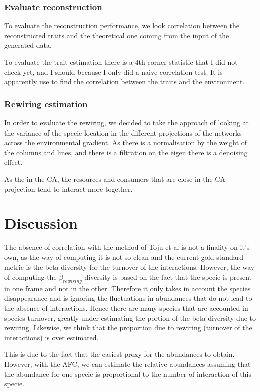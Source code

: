 \documentclass{article}
\begin{document}
\subsubsection{Evaluate reconstruction}

To evaluate the reconstruction performance, we look correlation between the reconstructed traits and the theoretical one coming from the input of the generated data.

To evaluate the trait estimation there is a 4th corner statistic that I did not check yet, and I should because I only did a naive correlation test. It is apparently use to find the correlation between the traits and the environment.

\subsubsection{Rewiring estimation}

In order to evaluate the rewiring, we decided to take the approach of looking at the variance of the specie location in the different projections of the networks across the environmental gradient. 
As there is a normalisation by the weight of the columns and lines, and there is a filtration on the eigen there is a denoising effect.

As the in the CA, the resources and consumers that are close in the CA projection tend to interact more together.

\section{Discussion}

The absence of correlation with the method of Toju et al is not a finality on it's own, as the way of computing it is not so clean and the current gold standard metric is the beta diversity for the turnover of the interactions. However, the way of computing the $\beta_{rewiring}$ diversity is based on the fact that the specie is present in one frame and not in the other. Therefore it only takes in account the species disappearance and is ignoring the fluctuations in abundances that do not lead to the absence of interactions. Hence there are many species that are accounted in species turnover, greatly under estimating the portion of the beta diversity due to rewiring. Likewise, we think that the proportion due to rewiring (turnover of the interactions) is over estimated.

This is due to the fact that the easiest proxy for the abundances to obtain. However, with the AFC, we can estimate the relative abundances assuming that the abundance for one specie is proportional to the number of interaction of this specie.
\end{document}

